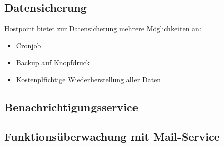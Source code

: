 

 


\subsection{Datensicherung}
Hostpoint bietet zur Datensicherung mehrere Möglichkeiten an:
\begin{itemize}
\item Cronjob
\item Backup auf Knopfdruck
\item Kostenplfichtige Wiederherstellung aller Daten
\end{itemize}








\subsection{Benachrichtigungsservice}

\subsection{Funktionsüberwachung mit Mail-Service}

